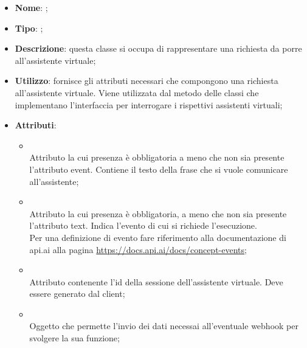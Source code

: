 \begin{itemize}
	\item \textbf{Nome}: ;
	\item \textbf{Tipo}: ;
	\item \textbf{Descrizione}: questa classe si occupa di rappresentare una richiesta da porre all'assistente virtuale;
	\item \textbf{Utilizzo}: fornisce gli attributi necessari che compongono una richiesta all'assistente virtuale. Viene utilizzata dal metodo  delle classi che implementano l'interfaccia  per interrogare i rispettivi assistenti virtuali;
	\item \textbf{Attributi}:
	\begin{itemize}
		\item[]  \\
		Attributo la cui presenza è obbligatoria a meno che non sia presente l'attributo event. Contiene il testo della frase che si vuole comunicare all'assistente;
		\item[]  \\
		Attributo la cui presenza è obbligatoria, a meno che non sia presente l'attributo text. Indica l'evento di cui si richiede l'esecuzione. \\ Per una definizione di evento fare riferimento alla documentazione di api.ai alla pagina \url{https://docs.api.ai/docs/concept-events};
		\item[]  \\
		Attributo contenente l'id della sessione dell'assistente virtuale. Deve essere generato dal client;
		\item[]  \\
		Oggetto che permette l'invio dei dati necessai all'eventuale webhook per svolgere la sua funzione;
	\end{itemize}
\end{itemize}

